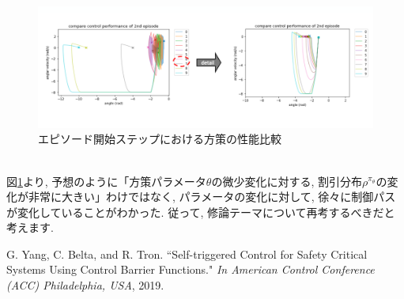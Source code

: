 \documentclass{jsarticle}
\begin{document}
\begin{figure}[h]
 	\includegraphics[width=16cm]{episode_distribution.png}
 	\caption{エピソード開始ステップにおける方策の性能比較} \label{ed}
\end{figure}\\
図\ref{ed}より, 予想のように「方策パラメータ$\theta$の微少変化に対する, 割引分布$\rho^{\pi_{\theta}}$の変化が非常に大きい」わけではなく, パラメータの変化に対して, 徐々に制御パスが変化していることがわかった. 従って, 修論テーマについて再考するべきだと考えます.





\begin{thebibliography}{10}
G. Yang, C. Belta, and R. Tron. “Self-triggered Control for Safety Critical Systems Using Control Barrier Functions."  \textit{In American Control Conference (ACC) Philadelphia, USA}, 2019.
 
 \end{thebibliography}
\end{document}

